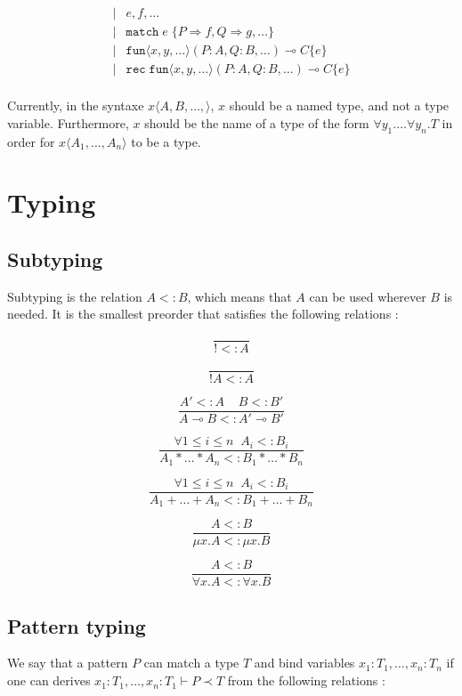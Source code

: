 \documentclass{scrartcl}
\newcommand{\linimp}{\multimap}
\newcommand{\subtype}{<\!:}
\begin{document}
\begin{minipage}[t]{1cm}
\begin{align*}
    | & e, f, \dots                                                                                      \\
    | & \mathtt{match}\;e\;\{ P \Rightarrow f, Q \Rightarrow g, \dots \}                                 \\
    | & \mathtt{fun} \langle x, y, \dots \rangle (P : A, Q : B, \dots) \multimap C \{ e \}               \\
    | & \mathtt{rec}\;\mathtt{fun} \langle x, y, \dots \rangle (P : A, Q : B, \dots) \multimap C \{ e \} \\
  \end{align*}
\end{minipage}

Currently, in the syntaxe $x \langle A, B, \dots, \rangle$, $x$ should be a named type, and not
a type variable. Furthermore, $x$ should be the name of a type of the form
$\forall y_1. \dots \forall y_n. T$ in order for $x \langle A_1, \dots, A_n \rangle$ to be a type.

\section{Typing}

\subsection{Subtyping}
Subtyping is the relation $A \subtype B$, which means that $A$ can be
used wherever $B$ is needed. It is the smallest preorder that satisfies the following relations :

\[
  \frac{}{! \subtype A}
\]

\[
  \frac{}{!A \subtype A}
\]

\[
  \frac{A' \subtype A \;\;\;\; B \subtype B'}{A \linimp B \subtype A' \linimp B'}
\]

\[
  \frac{\forall 1 \leq i \leq n \;\; A_i \subtype B_i}{A_1 * \dots * A_n \subtype B_1 * \dots * B_n}
\]

\[
  \frac{\forall 1 \leq i \leq n \;\; A_i \subtype B_i}{A_1 + \dots + A_n \subtype B_1 + \dots + B_n}
\]

\[
  \frac{A \subtype B}{\mu x. A \subtype \mu x. B}
\]

\[
  \frac{A \subtype B}{\forall x. A \subtype \forall x. B}
\]

\subsection{Pattern typing}
We say that a pattern $P$ can match a type $T$ and bind variables $x_1: T_1, \dots, x_n: T_n$
if one can derives $x_1: T_1, \dots, x_n: T_1 \vdash P \prec T$ from the following relations :
\end{document}
